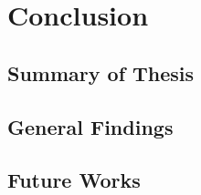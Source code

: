 
\chapter{Conclusion} %

\label{Conclusion} %




\section{Summary of Thesis}


\section{General Findings}

\section{Future Works}




